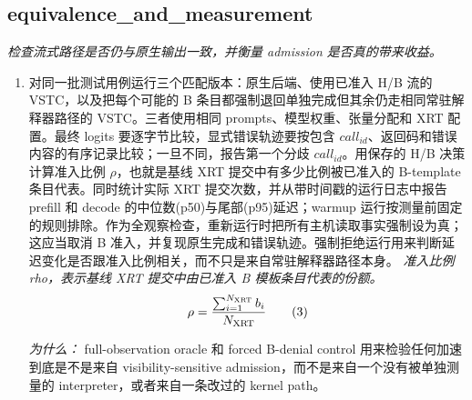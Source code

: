 \documentclass[10pt,a4paper]{article}
\begin{document}
\subsection*{equivalence\_and\_measurement}
\emph{检查流式路径是否仍与原生输出一致，并衡量 admission 是否真的带来收益。}
\begin{enumerate}[leftmargin=*,start=5]
  \item 对同一批测试用例运行三个匹配版本：原生后端、使用已准入 H/B 流的 VSTC，以及把每个可能的 B 条目都强制退回单独完成但其余仍走相同常驻解释器路径的 VSTC。三者使用相同 prompts、模型权重、张量分配和 XRT 配置。最终 logits 要逐字节比较，显式错误轨迹要按包含 \(call_{id}\)、返回码和错误内容的有序记录比较；一旦不同，报告第一个分歧 \(call_{id}\)。用保存的 H/B 决策计算准入比例 \(\rho \)，也就是基线 XRT 提交中有多少比例被已准入的 B-template 条目代表。同时统计实际 XRT 提交次数，并从带时间戳的运行日志中报告 prefill 和 decode 的中位数(p50)与尾部(p95)延迟；warmup 运行按测量前固定的规则排除。作为全观察检查，重新运行时把所有主机读取事实强制设为真；这应当取消 B 准入，并复现原生完成和错误轨迹。强制拒绝运行用来判断延迟变化是否跟准入比例相关，而不只是来自常驻解释器路径本身。
\noindent\emph{准入比例 rho，表示基线 XRT 提交中由已准入 B 模板条目代表的份额。}
\begin{equation}
\resizebox{\ifdim\width>\linewidth \linewidth\else\width\fi}{!}{$\displaystyle \rho = \frac{\sum_{i=1}^{N_{\mathrm{XRT}}} b_i}{N_{\mathrm{XRT}}}$} \tag{3}
\end{equation}
\par\emph{为什么：} full-observation oracle 和 forced B-denial control 用来检验任何加速到底是不是来自 visibility-sensitive admission，而不是来自一个没有被单独测量的 interpreter，或者来自一条改过的 kernel path。
\end{enumerate}
\end{document}
